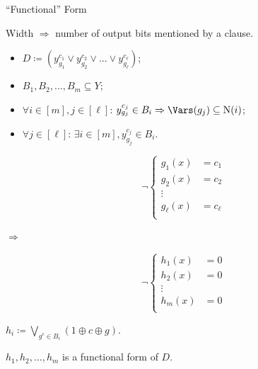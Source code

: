 \begin{frame}{``Functional'' Form}

    
    Width $\Rightarrow$ number of output bits \alert{mentioned} by a clause.

    \begin{itemize}
        \item $D \coloneqq (y^{c_1}_{g_1} \lor y^{c_2}_{g_2} \lor \dots \lor y^{c_{\ell}}_{g_{\ell}})$;
        \item $B_1, B_2, \dots, B_m \subseteq Y$;
        \item $\forall i \in [m], j \in [\ell]$: $y^{c_j}_{g_j} \in B_i \Rightarrow \Vars(g_j) \subseteq
            \mathrm{N}(i)$;
        \item $\forall j \in [\ell]$: $\exists i \in [m], y^{c_j}_{g_j} \in B_i$.
    \end{itemize}

    \vspace{0.2cm}
    \pause
    \begin{minipage}[c]{0.45\linewidth}
        \begin{equation*}
            \neg \left\{
              \begin{aligned}
                  g_1(x) &= c_1 \\
                  g_2(x) &= c_2 \\
                  \vdots \\
                  g_{\ell}(x) &= c_{\ell} \\
              \end{aligned}
            \right.
        \end{equation*}
    \end{minipage}
    \pause
    \begin{minipage}[c]{0.05\linewidth}
        $\Rightarrow$
    \end{minipage}
    \begin{minipage}[c]{0.45\linewidth}
        \begin{equation*}
            \neg \left\{
              \begin{aligned}
                  h_1(x) &= 0 \\
                  h_2(x) &= 0 \\
                  \vdots \\
                  h_{m}(x) &= 0 \\
              \end{aligned}
            \right.
        \end{equation*}
    \end{minipage}

    \pause
    \vspace{0.2cm}
    $h_i \coloneqq \bigvee\limits_{g^{c} \in B_i} (1 \oplus c \oplus g)$.

    \pause
    \vspace{0.4cm}
    $h_1, h_2, \dots, h_m$ is a functional form of $D$.
\end{frame}

